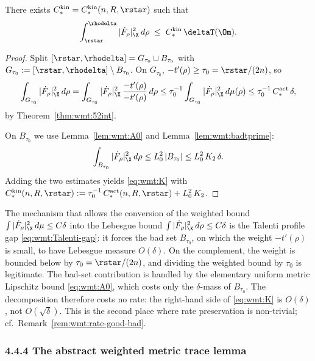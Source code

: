 \begin{theorem}\label{thm:wmt:K}
There exists $C_*^{\mathrm{kin}}=C_*^{\mathrm{kin}}(n,R,\rstar)$
such that
\begin{equation}\label{eq:wmt:K}
   \int_{\rstar}^{\rhodelta}|\dot F_\rho|_{\X}^2\,d\rho
   \;\le\; C_*^{\mathrm{kin}}\,\deltaT(\Om).
\end{equation}
\end{theorem}

\begin{proof}
Split $[\rstar,\rhodelta]=G_{\tau_0}\sqcup B_{\tau_0}$ with
$G_{\tau_0}:=[\rstar,\rhodelta]\setminus B_{\tau_0}$. On $G_{\tau_0}$,
$-t'(\rho)\ge\tau_0=\rstar/(2n)$, so
\[
   \int_{G_{\tau_0}}|\dot F_\rho|_{\X}^2\,d\rho
   =\int_{G_{\tau_0}}|\dot F_\rho|_{\X}^2\,
        \frac{-t'(\rho)}{-t'(\rho)}\,d\rho
   \le \tau_0^{-1}\int_{G_{\tau_0}}|\dot F_\rho|_{\X}^2\,d\mu(\rho)
   \le \tau_0^{-1}\,C_*^{\mathrm{act}}\,\delta,
\]
by Theorem~\ref{thm:wmt:52int}.

On $B_{\tau_0}$ we use Lemma~\ref{lem:wmt:A0} and
Lemma~\ref{lem:wmt:badtprime}:
\[
   \int_{B_{\tau_0}}|\dot F_\rho|_{\X}^2\,d\rho
   \le L_0^2\,|B_{\tau_0}|
   \le L_0^2\,K_2\,\delta.
\]
Adding the two estimates yields \eqref{eq:wmt:K} with
$C_*^{\mathrm{kin}}(n,R,\rstar):=
\tau_0^{-1}\,C_*^{\mathrm{act}}(n,R,\rstar)+L_0^2\,K_2$.
\end{proof}

\begin{remark}
\label{rem:wmt:profile-gap-mech}
The mechanism that allows the conversion of the weighted bound
$\int|\dot F_\rho|_{\X}^2\,d\mu\le C\delta$ into the Lebesgue bound
$\int|\dot F_\rho|_{\X}^2\,d\rho\le C\delta$ is the Talenti profile gap
\eqref{eq:wmt:Talenti-gap}: it forces the bad set $B_{\tau_0}$, on
which the weight $-t'(\rho)$ is small, to have Lebesgue measure
$O(\delta)$. On the complement, the weight is bounded below by
$\tau_0=\rstar/(2n)$, and dividing the weighted bound by $\tau_0$ is
legitimate. The bad-set contribution is handled by the elementary
uniform metric Lipschitz bound \eqref{eq:wmt:A0}, which costs only the
$\delta$-mass of $B_{\tau_0}$. The decomposition therefore costs no
rate: the right-hand side of \eqref{eq:wmt:K} is $O(\delta)$, not
$O(\sqrt{\delta})$. This is the second place where rate preservation
is non-trivial; cf.\ Remark~\ref{rem:wmt:rate-good-bad}.
\end{remark}

\subsubsection{4.4.4 The abstract weighted metric trace lemma}
\label{subsec:wmt:abstract}

